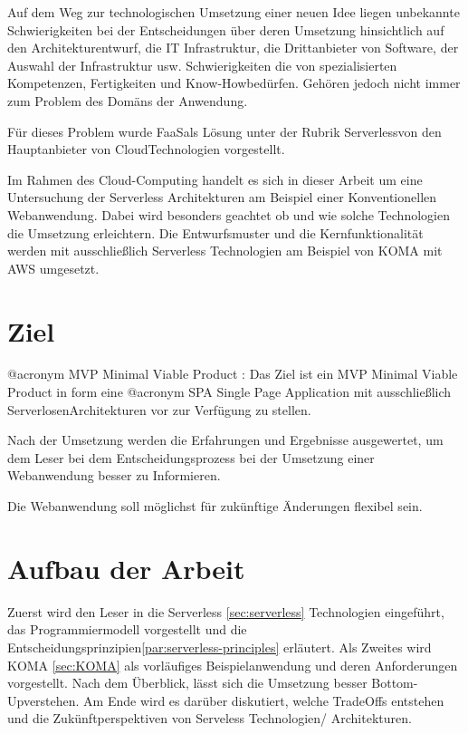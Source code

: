 \documentclass[
12pt,
english,
ngerman,
headsepline,
twoside,
openright,
numbers=noenddot,version=first
]{scrreprt}
\begin{document}
Auf dem Weg zur technologischen Umsetzung einer neuen Idee liegen unbekannte Schwierigkeiten
bei der Entscheidungen über deren Umsetzung hinsichtlich auf den Architekturentwurf, die IT Infrastruktur, die Drittanbieter von Software, der Auswahl der Infrastruktur usw.
Schwierigkeiten die von spezialisierten Kompetenzen, Fertigkeiten und \glqq Know-How\grqq bedürfen.
Gehören jedoch nicht immer zum Problem des Domäns der Anwendung.

Für dieses Problem wurde \glqq FaaS\grqq als Lösung unter der Rubrik \glqq Serverless\grqq von den Hauptanbieter von \glqq Cloud\grqq Technologien vorgestellt.

Im Rahmen des Cloud-Computing handelt es sich in dieser Arbeit um eine Untersuchung der Serverless Architekturen am Beispiel einer Konventionellen Webanwendung. Dabei wird besonders geachtet ob und wie solche Technologien die Umsetzung erleichtern. Die Entwurfsmuster und die Kernfunktionalität werden mit ausschließlich Serverless Technologien am Beispiel von KOMA mit AWS umgesetzt.


\section{Ziel}
\label{sec:task}
@acronym MVP Minimal Viable Product : \cite{rady2016serverless} Das Ziel ist ein MVP Minimal Viable Product in form eine @acronym SPA Single Page Application mit ausschließlich \glqq Serverlosen\grqq Architekturen vor zur Verfügung zu stellen.

Nach der Umsetzung werden die Erfahrungen und Ergebnisse ausgewertet, um dem Leser bei dem Entscheidungsprozess bei der Umsetzung einer Webanwendung besser zu Informieren.

Die Webanwendung soll möglichst für zukünftige Änderungen flexibel sein.

\section{Aufbau der Arbeit}
\label{sec:layout}

Zuerst wird den Leser in die Serverless \ref{sec:serverless} Technologien eingeführt, das Programmiermodell vorgestellt
und die Entscheidungsprinzipien\ref{par:serverless-principles} erläutert.
Als Zweites wird KOMA \ref{sec:KOMA} als vorläufiges Beispielanwendung und deren Anforderungen vorgestellt.
Nach dem Überblick, lässt sich die Umsetzung besser \glqq Bottom-Up\grqq verstehen.
Am Ende wird es darüber diskutiert, welche TradeOffs entstehen und die Zukünftperspektiven von Serveless Technologien/ Architekturen.
\end{document}
